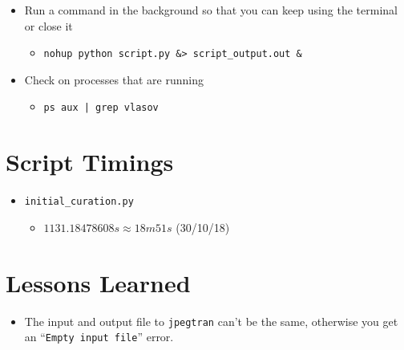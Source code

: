 \documentclass[11pt,a4paper]{report}
\begin{document}
\begin{itemize}

\item Run a command in the background so that you can keep using the terminal or close it
  \begin{itemize}
  \item \texttt{nohup python script.py \&> script\_output.out \&}
  \end{itemize}

\item Check on processes that are running
  \begin{itemize}
  \item \texttt{ps aux | grep vlasov}
  \end{itemize}

\end{itemize}


\section{Script Timings}
\label{sec:script-timings}

\begin{itemize}

\item \texttt{initial\_curation.py}
  \begin{itemize}
  \item $1131.18478608s \approx 18m51s$ (30/10/18)
  \end{itemize}

\end{itemize}

\section{Lessons Learned}
\label{sec:lessons-learned}

\begin{itemize}

\item The input and output file to \texttt{jpegtran} can't be the same, otherwise you get an ``\texttt{Empty input file}'' error.

\end{itemize}
\end{document}
